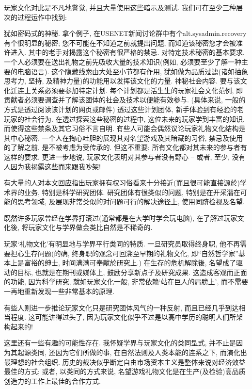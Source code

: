 \documentclass[a4paper,12pt,UTF8,twoside]{ctexbook}
\begin{document}
玩家文化对此是不凡地警觉, 并且大量使用这些暗示及测试. 我们可在至少三种层次的过程运作中找到:

犹如密码式的神秘. 拿个例子, 在USENET新闻讨论群中有个alt.sysadmin.recovery有个很明显的秘密; 您不可能在不知道之前就提出问题, 而知道该秘密您才会被准许进入. 其中的老手对揭露这个秘密有很严格的禁忌.
对特定技术秘密的基本要求. 一个人必须要在送出礼物之前先吸收大量的技术知识(例如, 必须要至少了解一种主要的电脑语言). 这个隐藏线索由大处至小节都有作用, 犹如做为品质过滤(诸如抽象思考力, 坚持, 及精神力量)的功能用以发挥该文化的力量.
神秘社会内容. 要与该文化迁连上关系必须要参加特定计划. 每个计划都是活生生的玩家社会文化范例, 即贡献者必须要调查并了解该团体的社会及技术以便能有效参与. (具体来说, 一般的方式是透过阅读该计划的网页或邮件) 透过这些计划团体, 新手体验到有经验的老玩家的社会行为.
在透过探索这些秘密的过程中, 这位未来的玩家学到丰富的知识, 而使得这些禁条及其它习俗不言自明.
有些人可能会偶然议论玩家礼物文化结构是其中心秘密. 一个人在掏心吐胆的展现其对名望游戏及其暗藏的习俗, 禁忌及使用的了解之前, 是不被考虑为受传承的. 但这不重要; 所有文化都对其未来的参与者有这样的要求. 更进一步地说, 玩家文化表明对其参与者没有野心 -- 或者, 至少, 没有人因为我揭露这些而来跟我吵架!

有大量的人对本文回应指出玩家拥有权习俗看来十分接近(而且很可能直接源於)学术界的业务, 特别是科学研究团体. 研究团体有很类似的问题, 特别是在开采潜在可能的思考领域, 及展现非常类似的对问题可行的解决途径上, 使用同跻检视及名望.

既然许多玩家曾经在学界打滚过(通常都是在大学时学会玩电脑), 在了解过玩家文化後, 将玩家文化与学界做会类比自然是不稀奇的.

玩家`礼物文化'有明显地与学界平行类同的特质. 一旦研究员取得终身职, 他不再需要担心生存问题(的确, 终身职的观念可回溯至早期的礼物文化, 即``自然哲学家''基本上是富裕的绅士, 时间满满可奉献於研究上.) 在生存的危机解除後, 名望成了驱动的目标, 也就是在期刊或媒体上, 鼓励分享新点子及研究成果. 这造成客观而正面的功能, 因为科学研究, 就如玩家文化一般, 非常依赖`站在巨人的肩膀上', 而不需要一再地重新发现一些非常基本的原理.

有些人则进一步推论玩家文化只是研究团体风气的一种反射, 而且已经几乎到达相当程度. 这可能讲得过头了, 因为玩家文化似乎不过是以高中学历的聪明人们所架构起来的!

这里还有一些有趣的可能性存在. 我怀疑学界与玩家文化的类同型式, 并不止是因为其起源类同, 还因为它们所做的事, 在自然法则及人类本能的连系之下, 而演化出最理想的社会组织.  历史的裁决似乎断定自由市场资本主义是整体来说对经济效益最佳的方式; 或者, 以类同的方式来说, 名望游戏礼物文化是在生产(及检验)高品质创造力的工作上最佳的合作方式.
\end{document}
